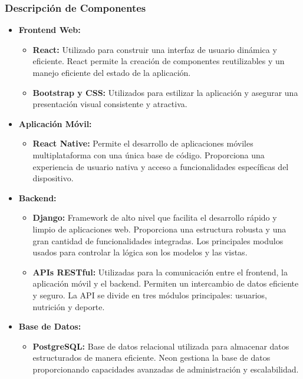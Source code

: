 \subsubsection{Descripción de Componentes}

\begin{itemize}
    \item \textbf{Frontend Web:} 
    \begin{itemize}
        \item \textbf{React:} Utilizado para construir una interfaz de usuario dinámica y eficiente. React permite la creación de componentes reutilizables y un manejo eficiente del estado de la aplicación.
        \item \textbf{Bootstrap y CSS:} Utilizados para estilizar la aplicación y asegurar una presentación visual consistente y atractiva.
    \end{itemize}
    
    \item \textbf{Aplicación Móvil:} 
    \begin{itemize}
        \item \textbf{React Native:} Permite el desarrollo de aplicaciones móviles multiplataforma con una única base de código. Proporciona una experiencia de usuario nativa y acceso a funcionalidades específicas del dispositivo.
    \end{itemize}
    
    \item \textbf{Backend:} 
    \begin{itemize}
        \item \textbf{Django:} Framework de alto nivel que facilita el desarrollo rápido y limpio de aplicaciones web. Proporciona una estructura robusta y una gran cantidad de funcionalidades integradas. Los principales modulos usados para controlar la lógica son los modelos y las vistas.
        \item \textbf{APIs RESTful:} Utilizadas para la comunicación entre el frontend, la aplicación móvil y el backend. Permiten un intercambio de datos eficiente y seguro. La API se divide en tres módulos principales: usuarios, nutrición y deporte.
    \end{itemize}
    
    \item \textbf{Base de Datos:} 
    \begin{itemize}
        \item \textbf{PostgreSQL:} Base de datos relacional utilizada para almacenar datos estructurados de manera eficiente. Neon gestiona la base de datos proporcionando capacidades avanzadas de administración y escalabilidad.
    \end{itemize}
    
\end{itemize}

